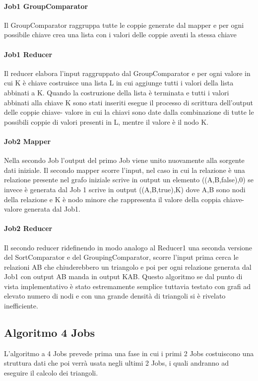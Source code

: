 \documentclass[paper=a4, fontsize=11pt]{scrartcl}	%
\numberwithin{equation}{section}															%
\numberwithin{figure}{section}																%
\numberwithin{table}{section}																%
\begin{document}
\paragraph{Job1 GroupComparator}
Il GroupComparator raggruppa tutte le coppie generate dal mapper e per ogni possibile chiave crea una lista con i valori delle coppie aventi la stessa chiave
\paragraph{Job1 Reducer}

Il reducer  elabora l'input raggruppato dal GroupComparator e per ogni valore in cui K è chiave costruisce una lista L in cui aggiunge tutti i valori della lista abbinati a K. Quando la costruzione della lista è terminata e tutti i valori abbinati alla chiave K sono stati inseriti esegue il processo di scrittura dell'output delle coppie chiave- valore in cui la chiavi sono date dalla combinazione di tutte le possibili coppie di valori presenti in L, mentre il valore è il nodo K.

\paragraph{Job2 Mapper}
Nella secondo Job l'output del primo Job viene unito nuovamente alla sorgente dati iniziale. Il secondo mapper scorre  l'input, nel caso in cui la relazione è una relazione presente nel grafo iniziale scrive in output un elemento ((A,B,false),0) se invece è generata dal Job 1 scrive in output  ((A,B,true),K) dove A,B sono nodi della relazione e K è nodo minore che rappresenta il valore della coppia chiave-valore generata dal Job1.
\paragraph{Job2 Reducer}
Il secondo reducer ridefinendo in modo analogo al Reducer1 una seconda versione del SortComparator e del GroupingComparator, scorre l'input prima cerca le relazioni AB che chiuderebbero un triangolo e poi per ogni relazione generata dal Job1 con output AB manda in output KAB.
Questo algoritmo se dal punto di vista implementativo è stato estremamente semplice tuttavia testato con grafi ad elevato numero di nodi e con una grande densità di triangoli  si è rivelato inefficiente.



\subsection{Algoritmo 4 Jobs}
L'algoritmo a 4 Jobs prevede prima una fase in cui i primi 2 Jobs costuiscono una struttura dati che poi verrà usata negli ultimi 2 Jobs, i quali andranno ad eseguire il calcolo dei triangoli.
\end{document}
